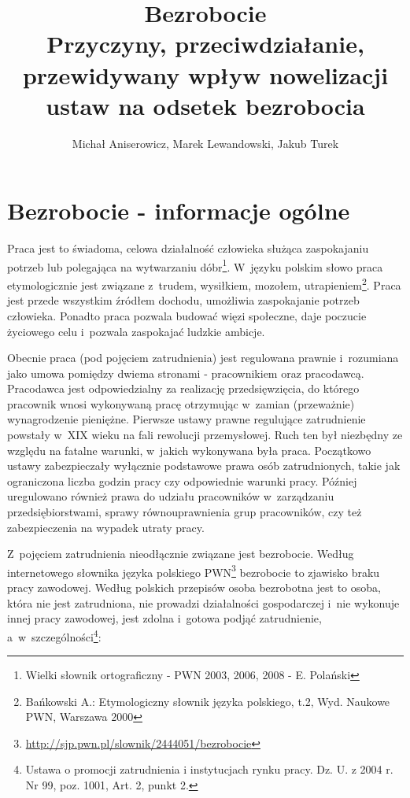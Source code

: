 \documentclass[12pt]{article}
\title{Bezrobocie \\ \Large{Przyczyny, przeciwdziałanie, przewidywany wpływ nowelizacji ustaw na odsetek bezrobocia}}
\author{Michał Aniserowicz, Marek Lewandowski, Jakub Turek}
\date{}
\begin{document}
    \maketitle
    
    \section*{Bezrobocie - informacje ogólne}
    
    Praca jest to świadoma, celowa działalność człowieka służąca zaspokajaniu potrzeb lub polegająca na wytwarzaniu dóbr\footnote{Wielki słownik ortograficzny - PWN 2003, 2006, 2008 - E. Polański}. W~języku polskim słowo praca etymologicznie jest związane z~trudem, wysiłkiem, mozołem, utrapieniem\footnote{Bańkowski A.: Etymologiczny słownik języka polskiego, t.2, Wyd. Naukowe PWN, Warszawa 2000}. Praca jest przede wszystkim źródłem dochodu, umożliwia zaspokajanie potrzeb człowieka. Ponadto praca pozwala budować więzi społeczne, daje poczucie życiowego celu i~pozwala zaspokajać ludzkie ambicje. 
    
    Obecnie praca (pod pojęciem zatrudnienia) jest regulowana prawnie i~rozumiana jako umowa pomiędzy dwiema stronami - pracownikiem oraz pracodawcą. Pracodawca jest odpowiedzialny za realizację przedsięwzięcia, do którego pracownik wnosi wykonywaną pracę otrzymując w~zamian (przeważnie) wynagrodzenie pieniężne. Pierwsze ustawy prawne regulujące zatrudnienie powstały w~XIX wieku na fali rewolucji przemysłowej. Ruch ten był niezbędny ze względu na fatalne warunki, w~jakich wykonywana była praca. Początkowo ustawy zabezpieczały wyłącznie podstawowe prawa osób zatrudnionych, takie jak ograniczona liczba godzin pracy czy odpowiednie warunki pracy. Później uregulowano również prawa do udziału pracowników w~zarządzaniu przedsiębiorstwami, sprawy równouprawnienia grup pracowników, czy też zabezpieczenia na wypadek utraty pracy.
    
    Z~pojęciem zatrudnienia nieodłącznie związane jest bezrobocie. Według internetowego słownika języka polskiego PWN\footnote{\url{http://sjp.pwn.pl/slownik/2444051/bezrobocie}} bezrobocie to zjawisko braku pracy zawodowej. Według polskich przepisów osoba bezrobotna jest to osoba, która nie jest zatrudniona, nie prowadzi działalności gospodarczej i~nie wykonuje innej pracy zawodowej, jest zdolna i~gotowa podjąć zatrudnienie, a~w~szczególności\footnote{Ustawa o promocji zatrudnienia i instytucjach rynku pracy. Dz. U. z 2004 r. Nr 99, poz. 1001, Art. 2, punkt 2.}:
    
\end{document}
